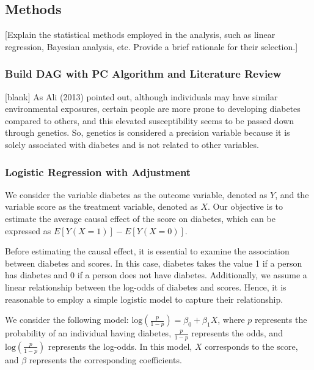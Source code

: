 \documentclass[
  12pt,
]{article}
\begin{document}
\hypertarget{methods}{%
\subsection{Methods}\label{methods}}

{[}Explain the statistical methods employed in the analysis, such as
linear regression, Bayesian analysis, etc. Provide a brief rationale for
their selection.{]}

\hypertarget{build-dag-with-pc-algorithm-and-literature-review}{%
\subsubsection{Build DAG with PC Algorithm and Literature
Review}\label{build-dag-with-pc-algorithm-and-literature-review}}

{[}blank{]} As Ali (2013) pointed out, although individuals may have
similar environmental exposures, certain people are more prone to
developing diabetes compared to others, and this elevated susceptibility
seems to be passed down through genetics. So, genetics is considered a
precision variable because it is solely associated with diabetes and is
not related to other variables.

\hypertarget{logistic-regression-with-adjustment}{%
\subsubsection{Logistic Regression with
Adjustment}\label{logistic-regression-with-adjustment}}

We consider the variable diabetes as the outcome variable, denoted as
\(Y\), and the variable score as the treatment variable, denoted as
\(X\). Our objective is to estimate the average causal effect of the
score on diabetes, which can be expressed as \(E[Y(X=1)] - E[Y(X=0)]\).

Before estimating the causal effect, it is essential to examine the
association between diabetes and scores. In this case, diabetes takes
the value 1 if a person has diabetes and 0 if a person does not have
diabetes. Additionally, we assume a linear relationship between the
log-odds of diabetes and scores. Hence, it is reasonable to employ a
simple logistic model to capture their relationship.

We consider the following model:
\(\text{log}(\frac{p}{1-p}) = \beta_0 + \beta_1 X\), where \(p\)
represents the probability of an individual having diabetes,
\(\frac{p}{1-p}\) represents the odds, and \(\text{log}(\frac{p}{1-p})\)
represents the log-odds. In this model, \(X\) corresponds to the score,
and \(\beta\) represents the corresponding coefficients.
\end{document}
